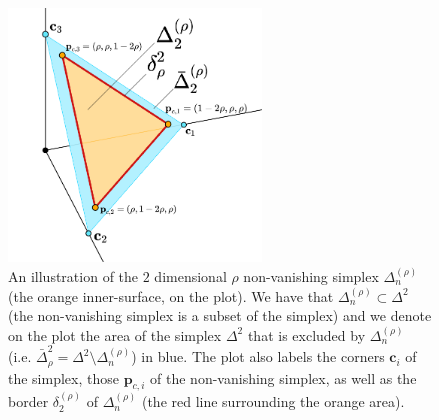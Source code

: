 \begin{figure}[h!]
    \centering
    \includegraphics[width=0.6\textwidth]{figures/2-simplex.png}
    \caption{An illustration of the $2$ dimensional $\rho$ non-vanishing simplex $\Delta^{(\rho)}_n$ (the orange inner-surface, on the plot). We have that $\Delta^{(\rho)}_n \subset \Delta^2$ (the non-vanishing simplex is a subset of the simplex) and we denote on the plot the area of the simplex $\Delta^2$ that is excluded by $\Delta^{(\rho)}_n$ (i.e. $\bar{\Delta}^2_\rho = \Delta^2 \setminus \Delta^{(\rho)}_n$) in blue. The plot also labels the corners $\bm{c}_i$ of the simplex, those $\bm{p}_{c,i}$ of the non-vanishing simplex, as well as the border $\delta_2^{(\rho)}$ of $\Delta^{(\rho)}_n$ (the red line surrounding the orange area).}
    \label{fig:2simple_nonvanishing}
\end{figure}

